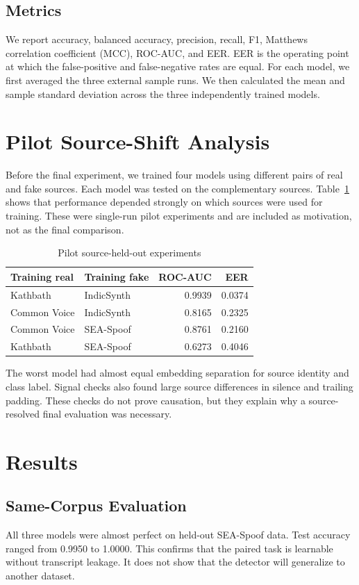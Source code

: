 \documentclass[conference]{IEEEtran}
\begin{document}
\subsection{Metrics}
We report accuracy, balanced accuracy, precision, recall, F1, Matthews
correlation coefficient (MCC), ROC-AUC, and EER. EER is the operating point
at which the false-positive and false-negative rates are equal. For each
model, we first averaged the three external sample runs. We then calculated
the mean and sample standard deviation across the three independently
trained models.

\section{Pilot Source-Shift Analysis}
Before the final experiment, we trained four models using different pairs of
real and fake sources. Each model was tested on the complementary sources.
Table~\ref{tab:factorial} shows that performance depended strongly on which
sources were used for training. These were single-run pilot experiments and
are included as motivation, not as the final comparison.

\begin{table}[t]
\caption{Pilot source-held-out experiments}
\label{tab:factorial}
\centering
\small
\begin{tabular}{llrr}
\toprule
Training real & Training fake & ROC-AUC & EER \\
\midrule
Kathbath & IndicSynth & 0.9939 & 0.0374 \\
Common Voice & IndicSynth & 0.8165 & 0.2325 \\
Common Voice & SEA-Spoof & 0.8761 & 0.2160 \\
Kathbath & SEA-Spoof & 0.6273 & 0.4046 \\
\bottomrule
\end{tabular}
\end{table}

The worst model had almost equal embedding separation for source identity
and class label. Signal checks also found large source differences in
silence and trailing padding. These checks do not prove causation, but they
explain why a source-resolved final evaluation was necessary.

\section{Results}
\subsection{Same-Corpus Evaluation}
All three models were almost perfect on held-out SEA-Spoof data. Test
accuracy ranged from 0.9950 to 1.0000. This confirms that the paired task is
learnable without transcript leakage. It does not show that the detector
will generalize to another dataset.
\end{document}
